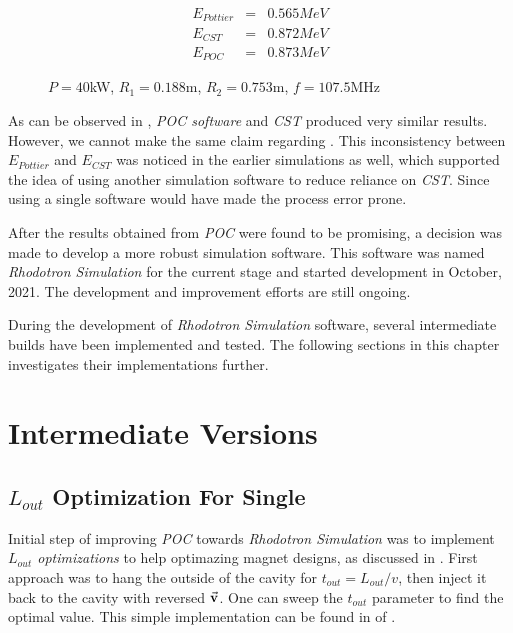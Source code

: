 \documentclass[a4paper,oneside,12pt]{report}
\numberwithin{equation}{chapter}
\begin{document}
\begin{figure}[H]
    \begin{eqnarray}
        E_{Pottier} &=& 0.565 MeV \nonumber\\
        E_{CST} &=& 0.872 MeV  \label{eq:poc_E_results}\\
        E_{POC} &=& 0.873 MeV \nonumber
    \end{eqnarray}
    \caption*{$P=40$kW, $R_1=0.188$m, $R_2=0.753$m, $f=107.5$MHz}
\end{figure}
As can be observed in , \textit{POC software} and \textit{CST} produced very similar results. However, we cannot make the same claim regarding .
This inconsistency between $E_{Pottier}$ and $E_{CST}$ was noticed in the earlier simulations as well, which supported the idea of using another simulation software to reduce reliance on \textit{CST}.
Since using a single software would have made the process error prone.

After the results obtained from \textit{POC} were found to be promising, a decision was made to develop a more robust simulation software. This software was named \textit{Rhodotron Simulation} for the current stage and started development in October, 2021.
The development and improvement efforts are still ongoing. 

During the development of \textit{Rhodotron Simulation} software, several intermediate builds have been implemented and tested. The following sections in this chapter investigates their implementations further.



\newpage


\section{Intermediate Versions}

\subsection{$L_{out}$ Optimization For Single \e} \label{sec:lout_sweep}
Initial step of improving \textit{POC} towards \textit{Rhodotron Simulation} was to implement \textit{$L_{out}$ optimizations} to help optimazing magnet designs, as discussed in .
First approach was to hang the \e outside of the cavity for $t_{out} = L_{out}/v$, then inject it back to the cavity with reversed $\vec{\textbf{v}}$. One can sweep the $t_{out}$ parameter to find the optimal value.
This simple implementation can be found in  of .
\end{document}

